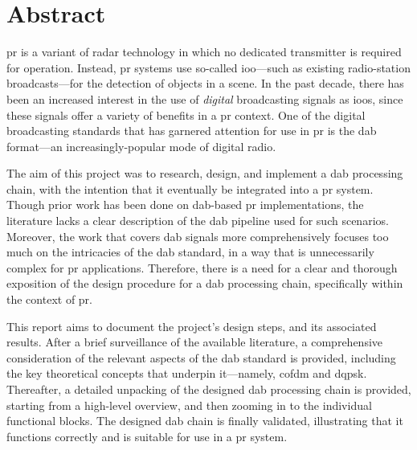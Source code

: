 \documentclass[class=report,11pt,crop=false]{standalone}
\begin{document}
\chapter*{Abstract}

\gls{pr} is a variant of radar technology in which no dedicated transmitter is required for operation. Instead, \gls{pr} systems use so-called \gls{ioo}---such as existing radio-station broadcasts---for the detection of objects in a scene. In the past decade, there has been an increased interest in the use of \emph{digital} broadcasting signals as \gls{ioo}s, since these signals offer a variety of benefits in a \gls{pr} context. One of the digital broadcasting standards that has garnered attention for use in \gls{pr} is the \gls{dab} format---an increasingly-popular mode of digital radio.

The aim of this project was to research, design, and implement a \gls{dab} processing chain, with the intention that it eventually be integrated into a \gls{pr} system. Though prior work has been done on \gls{dab}-based \gls{pr} implementations, the literature lacks a clear description of the \gls{dab} pipeline used for such scenarios. Moreover, the work that covers \gls{dab} signals more comprehensively focuses too much on the intricacies of the \gls{dab} standard, in a way that is unnecessarily complex for \gls{pr} applications. Therefore, there is a need for a clear and thorough exposition of the design procedure for a \gls{dab} processing chain, specifically within the context of \gls{pr}.

This report aims to document the project's design steps, and its associated results. After a brief surveillance of the available literature, a comprehensive consideration of the relevant aspects of the \gls{dab} standard is provided, including the key theoretical concepts that underpin it---namely, \gls{cofdm} and \gls{dqpsk}. Thereafter, a detailed unpacking of the designed \gls{dab} processing chain is provided, starting from a high-level overview, and then zooming in to the individual functional blocks. The designed \gls{dab} chain is finally validated, illustrating that it functions correctly and is suitable for use in a \gls{pr} system.

\ifstandalone
% 
\fi
\end{document}
